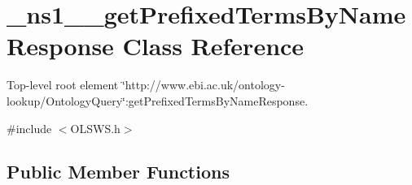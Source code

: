 \hypertarget{class__ns1____getPrefixedTermsByNameResponse}{
\section{\_\-ns1\_\-\_\-getPrefixedTermsByNameResponse Class Reference}
\label{class__ns1____getPrefixedTermsByNameResponse}
}


Top-\/level root element \char`\"{}http://www.ebi.ac.uk/ontology-\/lookup/OntologyQuery\char`\"{}:getPrefixedTermsByNameResponse.  




{\ttfamily \#include $<$OLSWS.h$>$}

\subsection*{Public Member Functions}
